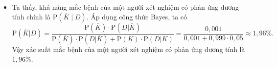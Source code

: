 \begin{ex}
{\begin{itemize}
\begin{center}
			\end{center}
			\item Ta thấy, khả năng mắc bệnh của một người xét nghiệm có phản ứng dương tính chính là $\mathrm{P}(\overline{K} \mid D)$. Áp dụng công thức Bayes, ta có
			$$
			\mathrm{P}(\overline{K}|D)=\dfrac{\mathrm{P}(\overline{K}) \cdot \mathrm{P}(D| \overline{K})}{\mathrm{P}(\overline{K}) \cdot \mathrm{P}(D| \overline{K})+\mathrm{P}(K) \cdot \mathrm{P}(D| K)}=\dfrac{0{,}001}{0{,}001+0{,}999 \cdot 0{,}05} \approx 1{,}96 \% .
			$$			
			Vậy xác suất mắc bệnh của một người xét nghiệm có phản ứng dương tính là $1{,}96\%$.
		\end{itemize}		
	}
\end{ex}

